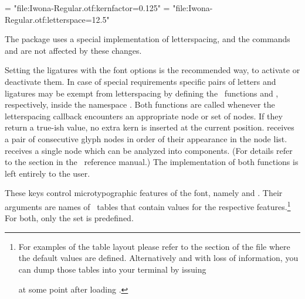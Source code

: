          \beginlisting
    \font \iwonakernedA = "file:Iwona-Regular.otf:kernfactor=0.125"
    \font \iwonakernedB = "file:Iwona-Regular.otf:letterspace=12.5"
         \endlisting

         The  package uses a special implementation of letterspacing, and the commands \inlinecode{\lsstyle} and \inlinecode{\textls} are  not affected by these changes.

         Setting the ligatures with the font options is the recommended way, to activate or deactivate them. In case of special requirements
         specific pairs of letters and ligatures may be exempt from
         letterspacing by defining the \Lua\ functions
          and ,
         respectively, inside the namespace .
         Both functions are called whenever the letterspacing callback
         encounters an appropriate node or set of nodes.
         If they return a true-ish value, no extra kern is inserted at
         the current position.
          receives a pair of consecutive
         glyph nodes in order of their appearance in the node list.
          receives a single node which can be
         analyzed into components.
         (For details refer to the  section in the
         \LuaTeX\ reference manual.)
         The implementation of both functions is left entirely to the
         user.
  \endaltitem

         These keys control microtypographic features of the font,
         namely  and .
         Their arguments are names of \Lua\ tables that contain
         values for the respective features.\footnote{%
            For examples of the table layout please refer to the
            section of the file  where the
            default values are defined.
            Alternatively and with loss of information, you can dump
            those tables into your terminal by issuing
            \unless \iffalse
              \beginlisting
 \directlua{inspect(fonts.protrusions.setups.default)
            inspect(fonts.expansions.setups.default)}
              \endlisting
            \else
              \typebuffer [printvectors]
            \fi
            at some point after loading .
         }
         For both, only the set  is predefined.


